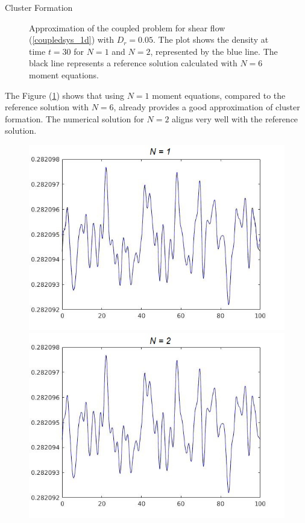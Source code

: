 \begin{frame}{Cluster Formation}
\begin{figure}
\begin{minipage}{0.46\textwidth}
		\end{minipage}
		\caption{Approximation of the coupled problem for shear flow (\ref{coupledsys_1d}) with $D_r =0.05$. The plot shows the density at time $t=30$ for $N = 1$ and $N = 2$, represented by the blue line. The black line represents a reference solution calculated with $N = 6$ moment equations.}
		\label{ClusterFormation}
	\end{figure}
	The Figure (\ref{ClusterFormation}) shows that using $N = 1$ moment equations, compared to the reference solution with $N = 6$, already provides a good approximation of cluster formation. The numerical solution for $N=2$ aligns very well with the reference solution.
\end{frame}

\begin{frame}
		\begin{figure}
		\centering
		\begin{minipage}{0.46\textwidth}
			\includegraphics[width=\textwidth]{Bilder_wx/ClusterFormation/cluster_N=1vsN=6_Dr=1_mx=8192}
		\end{minipage}
		\hfill
		\begin{minipage}{0.46\textwidth}
			\includegraphics[width=\textwidth]{Bilder_wx/ClusterFormation/cluster_N=2vsN=6_Dr=1_mx=8192}

\end{minipage}
\end{figure}
\end{frame}
